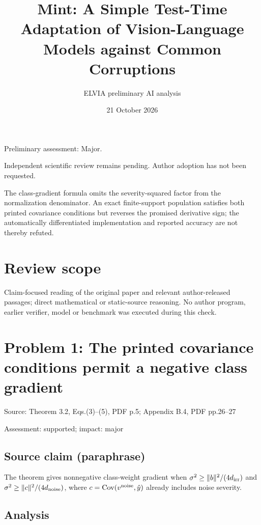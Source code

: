 \documentclass[11pt]{article}
\begin{document}
\title{Mint: A Simple Test-Time Adaptation of Vision-Language Models against Common Corruptions}

\author{ELVIA preliminary AI analysis}\date{21 October 2026}\maketitle

Preliminary assessment: Major.\par

Independent scientific review remains pending. Author adoption has not been requested.

The class-gradient formula omits the severity-squared factor from the normalization denominator. An exact finite-support population satisfies both printed covariance conditions but reverses the promised derivative sign; the automatically differentiated implementation and reported accuracy are not thereby refuted.

\section*{Review scope}

Claim-focused reading of the original paper and relevant author-released passages; direct mathematical or static-source reasoning. No author program, earlier verifier, model or benchmark was executed during this check.

\section*{Problem 1: The printed covariance conditions permit a negative class gradient}

Source: Theorem 3.2, Eqs.(3)–(5), PDF p.5; Appendix B.4, PDF pp.26–27

Assessment: supported; impact: major

\subsection*{Source claim (paraphrase)}

The theorem gives nonnegative class-weight gradient when \(\sigma^2\ge\|b\|^2/(4d_{\rm irr})\) and \(\sigma^2\ge\|c\|^2/(4d_{\rm noise})\), where \(c=\operatorname{Cov}(v^{\rm noise},\hat y)\) already includes noise severity.

\subsection*{Analysis}
\end{document}
